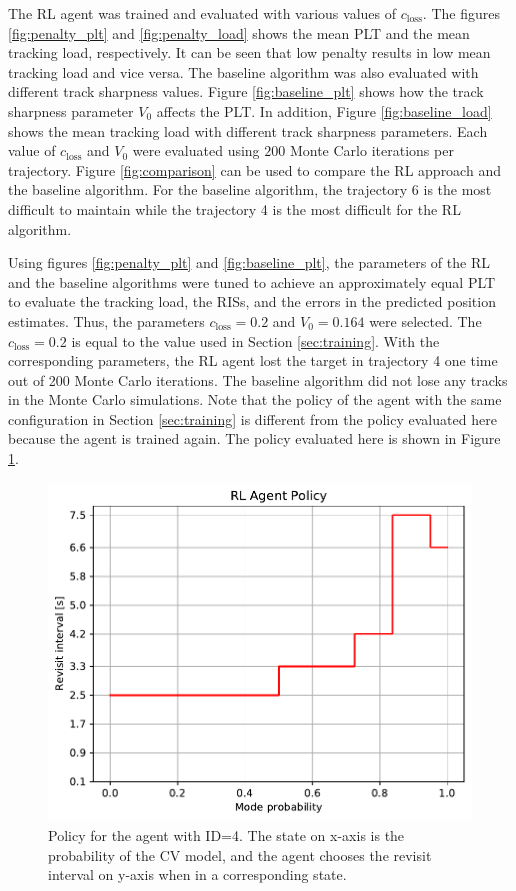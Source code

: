 \documentclass[english, 12pt, a4paper, elec, utf8, a-1b, online]{aaltothesis}
\newcommand{\closs}{c_\text{loss}}
\begin{document}
The RL agent was trained and evaluated with various values of $\closs$.
The figures \ref{fig:penalty_plt} and \ref{fig:penalty_load} shows the mean PLT and the mean tracking load, respectively.
It can be seen that low penalty results in low mean tracking load and vice versa.
The baseline algorithm was also evaluated with different track sharpness values.
Figure \ref{fig:baseline_plt} shows how the track sharpness parameter $V_0$ affects the PLT.
In addition, Figure \ref{fig:baseline_load} shows the mean tracking load with different track sharpness parameters.
Each value of $\closs$ and $V_0$ were evaluated using $200$ Monte Carlo iterations per trajectory.
Figure \ref{fig:comparison} can be used to compare the RL approach and the baseline algorithm.
For the baseline algorithm, the trajectory 6 is the most difficult to maintain while the trajectory 4 is the most difficult for the RL algorithm.

Using figures \ref{fig:penalty_plt} and \ref{fig:baseline_plt}, the parameters of the RL and the baseline algorithms were tuned to achieve an approximately equal PLT to evaluate the tracking load, the RISs, and the errors in the predicted position estimates.
Thus, the parameters $\closs = 0.2$ and $V_0=0.164$ were selected.
The $\closs=0.2$ is equal to the value used in Section \ref{sec:training}.
With the corresponding parameters, the RL agent lost the target in trajectory 4 one time out of 200 Monte Carlo iterations.
The baseline algorithm did not lose any tracks in the Monte Carlo simulations.
Note that the policy of the agent with the same configuration in Section \ref{sec:training} is different from the policy evaluated here because the agent is trained again.
The policy evaluated here is shown in Figure \ref{fig:policy_id4}.

\begin{figure}[tb]
    \centering
    \includegraphics[width=.8\linewidth]{figures/benchmark/Training/policy.pdf}
    \caption{Policy for the agent with ID=4. The state on x-axis is the probability of the CV model, and the agent chooses the revisit interval on y-axis when in a corresponding state.}
    \label{fig:policy_id4}
\end{figure}
\end{document}
